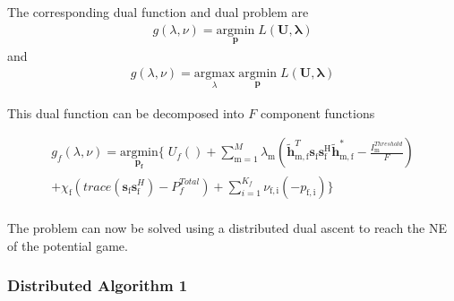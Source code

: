 \documentclass[12pt,a4paper]{report}
\begin{document}
The corresponding dual function and dual problem are  
\begin{gather*}
g(\lambda,\nu) = \underset{\mathbf{p}}{\mathrm{argmin}}\;L(\mathbf{U,\lambda})
\end{gather*}
and 
\begin{gather*}
g(\lambda,\nu) = \underset{\lambda}{\mathrm{argmax}}\;\underset{\mathbf{p}}{\mathrm{argmin}}\;L(\mathbf{U,\lambda})
\end{gather*}

This dual function can be decomposed into $F$ component functions


\begin{multline}
g_f(\lambda,\nu) = \underset{\mathbf{p_f}}{\mathrm{argmin}}
\{
\;
U_f() 
+
\sum_{\mathrm{m=1}}^M \lambda_{\mathrm{m}}
(\mathbf{\tilde{h}}_{\mathrm{m,f}}^T  \mathbf{s}_{\mathrm{f}} 						
	\mathbf{s_{\mathrm{f}}^{\mathrm{H}}} \mathbf{\tilde{h}_{\mathrm{m,f}}^*} - \frac{I^{Threshold}_{\mathrm{m}}}{F})
\\
+ 
\chi_{\mathrm{f}}(trace(\mathbf{s}_\mathrm{f}\mathbf{s}_\mathrm{f}^H)-P^{Total}_{f} )
+
\sum_{i=1}^{K_f}
\nu_{\mathrm{f,i}}(-p_{\mathrm{f,i}})\}
\end{multline}
\\

The problem can now be solved using a distributed dual ascent to reach the NE of the potential game. 
\subsubsection{Distributed Algorithm 1}\label{algo1}
\end{document}
